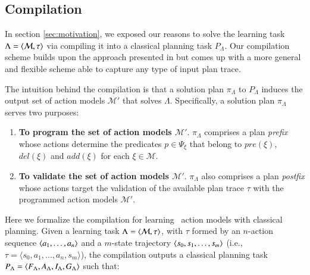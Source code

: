 \subsection{Compilation}
\label{compilation}

In section \ref{sec:motivation}, we exposed our reasons to solve the learning task $\Lambda={\langle \mathcal{M},\tau \rangle}$ via compiling it into a classical planning task $P_{\Lambda}$. Our compilation scheme  builds upon the approach presented in \cite{aineto2018learning} but \FAMA comes up with a more general and flexible scheme able to capture any type of input plan trace.

The intuition behind the \FAMA compilation is that a solution plan $\pi_\Lambda$ to $P_{\Lambda}$ induces the output set of action models $\mathcal{M}'$ that solves $\Lambda$. Specifically, a solution plan $\pi_\Lambda$ serves two purposes:

\begin{enumerate}
\item {\bf To program the set of action models $\mathcal{M}'$}. $\pi_\Lambda$ comprises a plan {\em prefix} whose actions determine the predicates $p\in \Psi_{\xi}$ that belong to $pre(\xi)$, $del(\xi)$ and $add(\xi)$ for each $\xi\in\mathcal{M}$.
\item {\bf To validate the set of action models $\mathcal{M}'$}. $\pi_\Lambda$ also comprises a plan {\em postfix} whose actions target the validation of the available plan trace $\tau$ with the programmed action models $\mathcal{M}'$.
\end{enumerate}

Here we formalize the compilation for learning \strips\ action models with classical planning. Given a learning task $\Lambda={\langle \mathcal{M},\tau \rangle}$, with $\tau$ formed by an $n$-action sequence ${\langle a_1, \ldots, a_n \rangle}$ and a $m$-state trajectory ${\langle s_0, s_1, \ldots, s_m \rangle}$ (i.e., $\tau = \langle s_0, a_1, \ldots, a_n, s_m \rangle$), the compilation outputs a classical planning task $P_{\Lambda}={\langle F_{\Lambda},A_{\Lambda},I_{\Lambda},G_{\Lambda} \rangle}$ such that:

